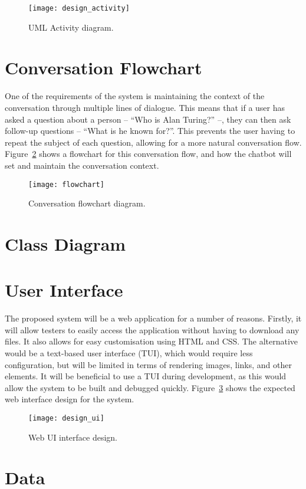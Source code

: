 \begin{figure}[h]
	\begin{center}
		\texttt{[image: design\_activity]}
	\end{center}
	\caption{UML Activity diagram.}
	\label{fig:design_activity}
\end{figure}

\section{Conversation Flowchart}
One of the requirements of the system is maintaining the context of the conversation through multiple lines of dialogue. This means that if a user has asked a question about a person -- ``Who is Alan Turing?'' --, they can then ask follow-up questions -- ``What is he known for?''. This prevents the user having to repeat the subject of each question, allowing for a more natural conversation flow. Figure~\ref{fig:flowchart} shows a flowchart for this conversation flow, and how the chatbot will set and maintain the conversation context.

\begin{figure}[h]
	\begin{center}
		\texttt{[image: flowchart]}
	\end{center}
	\caption{Conversation flowchart diagram.}
	\label{fig:flowchart}
\end{figure}

\section{Class Diagram}

\newpage
\section{User Interface}
The proposed system will be a web application for a number of reasons. Firstly, it will allow testers to easily access the application without having to download any files. It also allows for easy customisation using HTML and CSS. The alternative would be a text-based user interface (TUI), which would require less configuration, but will be limited in terms of rendering images, links, and other elements. It will be beneficial to use a TUI during development, as this would allow the system to be built and debugged quickly. Figure~\ref{fig:design_ui} shows the expected web interface design for the system.

\begin{figure}[h]
	\begin{center}
		\texttt{[image: design\_ui]}
	\end{center}
	\caption{Web UI interface design.}
	\label{fig:design_ui}
\end{figure}

\section{Data}